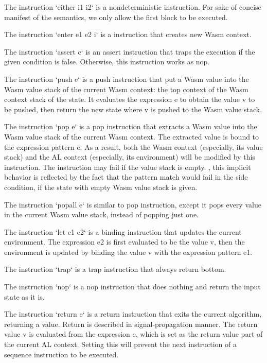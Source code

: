 The instruction `either i1 i2` is a nondeterministic instruction. For sake of concise manifest of the
semantics, we only allow the first block to be executed. 

The instruction `enter e1 e2 i` is a instruction that creates new Wasm context. 

The instruction `assert c` is an assert instruction that traps the execution if
the given condition is false. Otherwise, this instruction works as nop.

The instruction `push e` is a push instruction that put a Wasm value into the Wasm value stack
of the current Wasm context: the top context of the Wasm context stack of the state. It evaluates
the expression e to obtain the value v to be pushed, then return the new state where v is pushed to
the Wasm value stack.

The instruction `pop e` is a pop instruction that extracts a Wasm value into the Wasm value stack
of the current Wasm context. The extracted value is bound to the expression pattern e. As a result,
both the Wasm context (especially, its value stack) and the AL context (especially, its environment)
will be modified by this instruction. The instruction may fail if the value stack is empty. , this implicit behavior is reflected by the fact that the pattern match would
fail in the side condition, if the state with empty Wasm value stack is given.

The instruction `popall e` is similar to pop instruction, except it pops every value
in the current Wasm value stack, instead of popping just one.

The instruction `let e1 e2` is a binding instruction that updates the current environment.
The expression e2 is first evaluated to be the value v, then the environment is updated
by binding the value v with the expression pattern e1.

The instruction `trap` is a trap instruction that always return bottom.

The instruction `nop` is a nop instruction that does nothing and return the input state as it is.

The instruction `return e` is a return instruction that exits the current algorithm, returning a value.
Return is described in signal-propagation manner. The return value v is evaluated from the expression e,
which is set as the return value part of the current AL context. Setting this will prevent the
next instruction of a sequence instruction to be executed.

